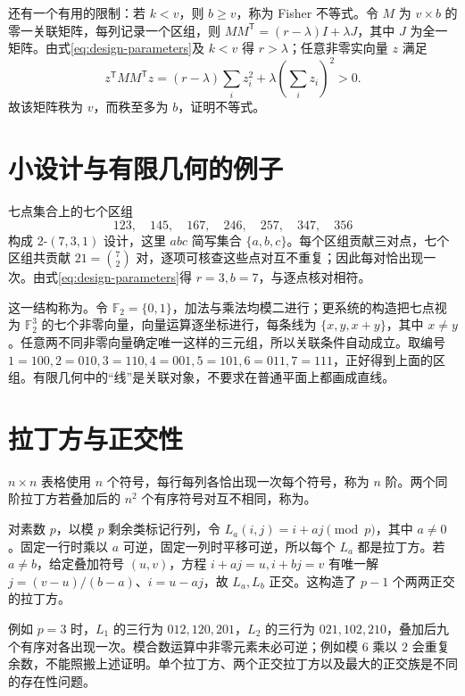 \documentclass[UTF8,12pt,a4paper,fontset=fandol]{ctexbook}
\begin{document}
还有一个有用的限制：若 $k<v$，则 $b\ge v$，称为 Fisher 不等式。令 $M$ 为 $v\times b$ 的零一关联矩阵，每列记录一个区组，则 $MM^{\mathsf T}=(r-\lambda)I+\lambda J$，其中 $J$ 为全一矩阵。由式\eqref{eq:design-parameters}及 $k<v$ 得 $r>\lambda$；任意非零实向量 $z$ 满足
\[
 z^{\mathsf T}MM^{\mathsf T}z=(r-\lambda)\sum_i z_i^2+
                       \lambda\left(\sum_i z_i\right)^2>0.
\]
故该矩阵秩为 $v$，而秩至多为 $b$，证明不等式。

\section{小设计与有限几何的例子}

七点集合上的七个区组
\[
 123,\quad145,\quad167,\quad246,\quad257,\quad347,\quad356
\]
构成 $2$-$(7,3,1)$ 设计，这里 $abc$ 简写集合 $\{a,b,c\}$。每个区组贡献三对点，七个区组共贡献 $21=\binom72$ 对，逐项可核查这些点对互不重复；因此每对恰出现一次。由式\eqref{eq:design-parameters}得 $r=3,b=7$，与逐点核对相符。

这一结构称为。令 $\mathbb F_2=\{0,1\}$，加法与乘法均模二进行；更系统的构造把七点视为 $\mathbb F_2^3$ 的七个非零向量，向量运算逐坐标进行，每条线为 $\{x,y,x+y\}$，其中 $x\ne y$。任意两不同非零向量确定唯一这样的三元组，所以关联条件自动成立。取编号 $1=100,2=010,3=110,4=001,5=101,6=011,7=111$，正好得到上面的区组。有限几何中的“线”是关联对象，不要求在普通平面上都画成直线。

\section{拉丁方与正交性}

\begin{definition}
$n\times n$ 表格使用 $n$ 个符号，每行每列各恰出现一次每个符号，称为 $n$ 阶。两个同阶拉丁方若叠加后的 $n^2$ 个有序符号对互不相同，称为。
\end{definition}

对素数 $p$，以模 $p$ 剩余类标记行列，令 $L_a(i,j)=i+aj\pmod p$，其中 $a\ne0$。固定一行时乘以 $a$ 可逆，固定一列时平移可逆，所以每个 $L_a$ 都是拉丁方。若 $a\ne b$，给定叠加符号 $(u,v)$，方程 $i+aj=u,i+bj=v$ 有唯一解 $j=(v-u)/(b-a)$、$i=u-aj$，故 $L_a,L_b$ 正交。这构造了 $p-1$ 个两两正交的拉丁方。

例如 $p=3$ 时，$L_1$ 的三行为 $012,120,201$，$L_2$ 的三行为 $021,102,210$，叠加后九个有序对各出现一次。模合数运算中非零元素未必可逆；例如模 $6$ 乘以 $2$ 会重复余数，不能照搬上述证明。单个拉丁方、两个正交拉丁方以及最大的正交族是不同的存在性问题。
\end{document}
